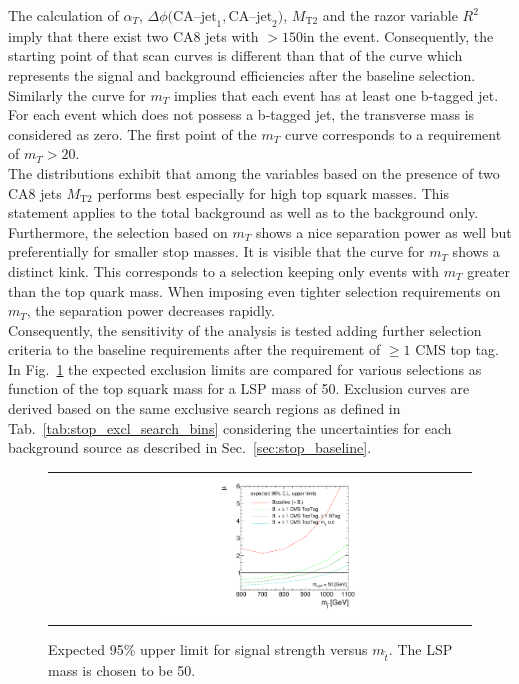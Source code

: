 The calculation of $\alpha_T$, $\Delta \phi(\mathrm{CA}$--$\mathrm{jet}_1, \mathrm{CA}$--$\mathrm{jet}_2)$, $M_\mathrm{T2}$ and the razor variable $R^2$ imply that there exist two CA8 jets with \pt$> 150$\gev in the event. Consequently, the starting point of that scan curves is different than that of the \met curve which represents the signal and background efficiencies after the baseline selection. Similarly the curve for $m_T$ implies that each event has at least one b-tagged jet. For each event which does not possess a b-tagged jet, the transverse mass is considered as zero. The first point of the $m_T$ curve corresponds to a requirement of $m_T > 20$\gev.  \\
The distributions exhibit that among the variables based on the presence of two CA8 jets $M_\mathrm{T2}$ performs best especially for high top squark masses. This statement applies to the total background as well as to the \ttbar background only. Furthermore, the selection based on $m_T$ shows a nice separation power as well but preferentially for smaller stop masses. It is visible that the curve for $m_T$ shows a distinct kink. This corresponds to a selection keeping only events with $m_T$ greater than the top quark mass. When imposing even tighter selection requirements on $m_T$, the separation power decreases rapidly. \\ 
Consequently,  the sensitivity of the analysis is tested adding further selection criteria to the baseline requirements after the requirement of $\ge 1$ CMS top tag. In Fig.~\ref{fig:stop_baselinetoptag_limit} the expected exclusion limits are compared for various selections as function of the top squark mass for a LSP mass of 50\gev. Exclusion curves are derived based on the same exclusive search regions as defined in Tab.~\ref{tab:stop_excl_search_bins} considering the uncertainties for each background source as described in Sec.~\ref{sec:stop_baseline}. \\
\begin{figure}[!h]
  \centering
  \begin{tabular}{c}
                \includegraphics[width=0.49\textwidth]{figures/limitplot4BinSel_BaselineBTagTopTagTransverseMass.pdf} 
  \end{tabular}
  \caption{Expected 95\% upper limit for signal strength versus $m_{\tilde{t}}$. The LSP mass is chosen to be 50\gev.}
  \label{fig:stop_baselinetoptag_limit}
\end{figure}

